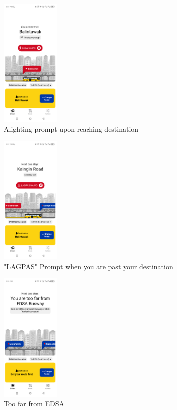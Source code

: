 \documentclass{icsthesis}
\begin{document}
\begin{mainmatter}
\begin{figure}[htbp]
  \centering
  \includegraphics[width=0.25\textwidth]{Texfiles/screenshots/EDSAan_baba.png}
  \caption{Alighting prompt upon reaching destination}
  \label{fig:yourlabel}
\end{figure}

\begin{figure}[htbp]
  \centering
  \includegraphics[width=0.25\textwidth]{Texfiles/screenshots/EDSAan_lagpas.png}
  \caption{"LAGPAS" Prompt when you are past your destination}
  \label{fig:yourlabel}
\end{figure}

\begin{figure}[htbp]
  \centering
  \includegraphics[width=0.25\textwidth]{Texfiles/screenshots/EDSAan_toofar.png}
  \caption{Too far from EDSA}
  \label{fig:yourlabel}
\end{figure}


\end{mainmatter}
\end{document}
